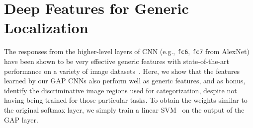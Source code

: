 \documentclass[10pt,twocolumn,letterpaper]{article}
\begin{document}
%
%


\section{Deep Features for Generic Localization}

The responses from the higher-level layers of CNN (e.g., \texttt{fc6}, \texttt{fc7} from AlexNet) have been shown to be very effective generic features with state-of-the-art performance on a variety of image datasets~\cite{donahue2014decaf,razavian2014cnn,zhou2014learning}. Here, we show that the features learned by our GAP CNNs also perform well as generic features, and as bonus, identify the discriminative image regions used for categorization, despite not having being trained for those particular tasks. To obtain the weights similar to the original softmax layer, we simply train a linear SVM~\cite{fan2008liblinear} on the output of the GAP layer.

\end{document}
